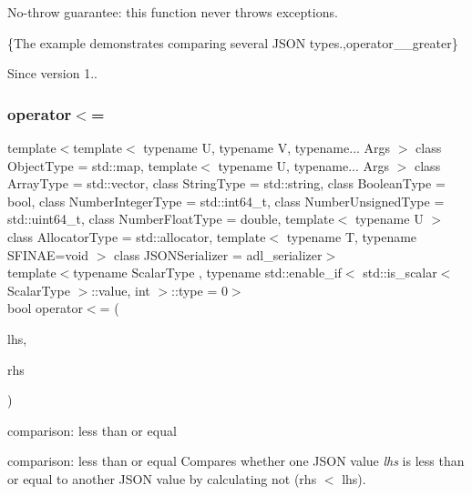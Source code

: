 No-\/throw guarantee\+: this function never throws exceptions.

\{The example demonstrates comparing several J\+S\+ON types.,operator\+\_\+\+\_\+greater\}

\begin{DoxySince}{Since}
version 1.. 
\end{DoxySince}
\mbox{\label{classnlohmann_1_1basic__json_ad73f88f70fe5acfa521750a8cd710026}} 
\subsubsection{\texorpdfstring{operator$<$=}{operator<=}\hspace{0.1cm}{\footnotesize\ttfamily [3/3]}}
{\footnotesize\ttfamily template$<$template$<$ typename U, typename V, typename... Args $>$ class Object\+Type = std\+::map, template$<$ typename U, typename... Args $>$ class Array\+Type = std\+::vector, class String\+Type  = std\+::string, class Boolean\+Type  = bool, class Number\+Integer\+Type  = std\+::int64\+\_\+t, class Number\+Unsigned\+Type  = std\+::uint64\+\_\+t, class Number\+Float\+Type  = double, template$<$ typename U $>$ class Allocator\+Type = std\+::allocator, template$<$ typename T, typename S\+F\+I\+N\+A\+E=void $>$ class J\+S\+O\+N\+Serializer = adl\+\_\+serializer$>$ \\
template$<$typename Scalar\+Type , typename std\+::enable\+\_\+if$<$ std\+::is\+\_\+scalar$<$ Scalar\+Type $>$\+::value, int $>$\+::type  = 0$>$ \\
bool operator$<$= (\begin{DoxyParamCaption}\item[{const Scalar\+Type}]{lhs,  }\item[{\mbox{\hyperlink{classnlohmann_1_1basic__json_a4057c5425f4faacfe39a8046871786ca}{const\+\_\+reference}}}]{rhs }\end{DoxyParamCaption})\hspace{0.3cm}{\ttfamily [friend]}}



comparison\+: less than or equal 

comparison\+: less than or equal Compares whether one J\+S\+ON value {\itshape lhs} is less than or equal to another J\+S\+ON value by calculating {\ttfamily not (rhs $<$ lhs)}.


